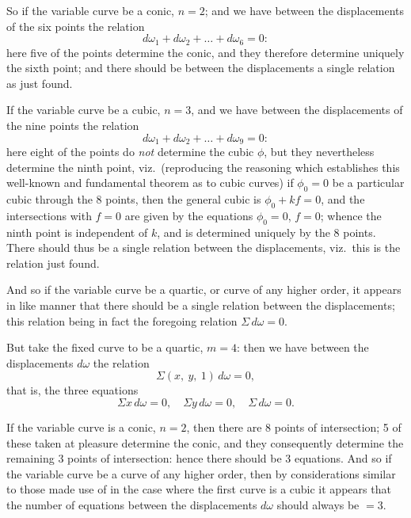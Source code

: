 \documentclass[11pt,a4paper]{article}
\providecommand{\textsc}[1]{{\scshape #1}}
\begin{document}
\fancyhead[C]{\small\textsc{note on abel's theorem.}}
\fancyhead[R]{\small [805}

\thispagestyle{plain}
\noindent So if the variable curve be a conic, $n = 2$; and we have between the displacements of the six points the relation
\[
d\omega_{1} + d\omega_{2} + \ldots + d\omega_{6} = 0:
\]
here five of the points determine the conic, and they therefore determine uniquely the sixth point; and there should be between the displacements a single relation as just found.

\medskip
If the variable curve be a cubic, $n = 3$, and we have between the displacements of the nine points the relation
\[
d\omega_{1} + d\omega_{2} + \ldots + d\omega_{9} = 0:
\]
here eight of the points do \emph{not} determine the cubic $\phi$, but they nevertheless determine the ninth point, viz.\ (reproducing the reasoning which establishes this well-known and fundamental theorem as to cubic curves) if $\phi_{0} = 0$ be a particular cubic through the 8 points, then the general cubic is $\phi_{0} + kf = 0$, and the intersections with $f = 0$ are given by the equations $\phi_{0} = 0$, $f = 0$; whence the ninth point is independent of $k$, and is determined uniquely by the 8 points.  There should thus be a single relation between the displacements, viz.\ this is the relation just found.

\medskip
And so if the variable curve be a quartic, or curve of any higher order, it appears in like manner that there should be a single relation between the displacements; this relation being in fact the foregoing relation $\Sigma\,d\omega = 0$.

\medskip
But take the fixed curve to be a quartic, $m = 4$: then we have between the displacements $d\omega$ the relation
\[
\Sigma(x,\ y,\ 1)\,d\omega = 0,
\]
that is, the three equations
\[
\Sigma x\,d\omega = 0,\quad \Sigma y\,d\omega = 0,\quad \Sigma\,d\omega = 0.
\]

\medskip
If the variable curve is a conic, $n = 2$, then there are 8 points of intersection; 5 of these taken at pleasure determine the conic, and they consequently determine the remaining 3 points of intersection: hence there should be 3 equations.  And so if the variable curve be a curve of any higher order, then by considerations similar to those made use of in the case where the first curve is a cubic it appears that the number of equations between the displacements $d\omega$ should always be $= 3$.
\end{document}
